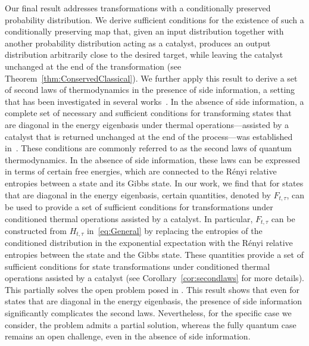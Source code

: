 \documentclass[aps,pra,11pt,onecolumn,nofootinbib,tightenlines]{revtex4-2}
\theoremstyle{definition}
\begin{document}
Our final result addresses transformations with a conditionally preserved probability distribution. We derive sufficient conditions for the existence of such a conditionally preserving map that, given an input distribution together with another probability distribution acting as a catalyst, produces an output distribution arbitrarily close to the desired target, while leaving the catalyst unchanged at the end of the transformation (see Theorem~\ref{thm:ConservedClassical}).
We further apply this result to derive a set of second laws of thermodynamics in the presence of side information, a setting that has been investigated in several works~\cite{sagawa2008second,morris2019assisted,rio2011thermodynamic,bera2017generalized,ji2025fundamental,narasimhachar2017resource}.
In the absence of side information, a complete set of necessary and sufficient conditions for transforming states that are diagonal in the energy eigenbasis under thermal operations—assisted by a catalyst that is returned unchanged at the end of the process—was established in~\cite{Brandao}.
 These conditions are commonly referred to as the second laws of quantum thermodynamics. In the absence of side information, these laws can be expressed in terms of certain free energies, which are connected to the Rényi relative entropies between a state and its Gibbs state.
 In our work, we find that for states that are diagonal in the energy eigenbasis, certain quantities, denoted by $F_{t,\tau}$,  can be used to provide a set of sufficient conditions for transformations under conditioned thermal operations assisted by a catalyst. In particular,
 \(F_{t,\tau}\) can be constructed from \(H_{t,\tau}\) in~\eqref{eq:General} by replacing the entropies of the conditioned distribution in the exponential expectation with the R\'enyi relative entropies between the state and the Gibbs state. These quantities provide a set of sufficient conditions for state transformations under conditioned thermal operations assisted by a catalyst (see Corollary~\ref{cor:secondlaws} for more details).
This partially solves the open problem posed in \cite[Section V.B]{ji2025fundamental}.
This result shows that even for states that are diagonal in the energy eigenbasis, the presence of side information significantly complicates the second laws. Nevertheless, for the specific case we consider, the problem admits a partial solution, whereas the fully quantum case remains an open challenge, even in the absence of side information.
\end{document}
